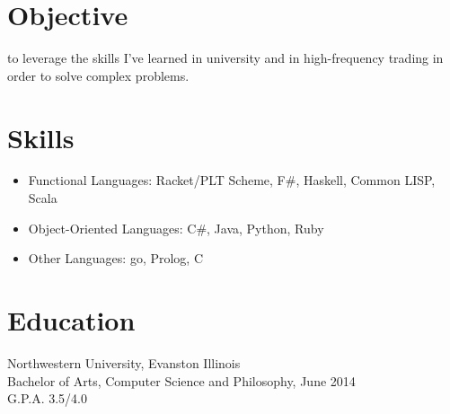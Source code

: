\documentclass{res}
\begin{document}
 


  \address{\bf  PRESENT ADDRESS\\636 Church Street\\Evanston Illinois, 60201\\apt. 901}
  \address{\bf CONTACT \\ (713)540-6960\\https://github.com/jcc333\\clemer19@gmail.com}

  \begin{resume}

  \section{Objective} to leverage the skills I've learned in university and in high-frequency trading in order to solve complex problems.

  \section{Skills}          
  \begin{itemize}
  \item Functional Languages: Racket/PLT Scheme, F$\#$, Haskell, Common LISP, Scala
  \item Object-Oriented Languages: C$\#$, Java, Python, Ruby
  \item Other Languages: go, Prolog, C
  \end{itemize}

  \section{Education}          
  Northwestern University, Evanston Illinois \\
    Bachelor of Arts, Computer Science and Philosophy, June 2014 \\       
    G.P.A. 3.5/4.0          


\end{resume}
\end{document}
